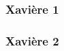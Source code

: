 \begin{frame}
    \frametitle{Xavière 1}
\end{frame}

\begin{frame}
    \frametitle{Xavière 2}
\end{frame}
